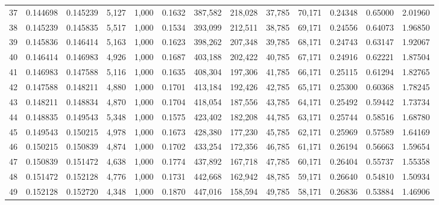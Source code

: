 \begin{tabular}{rrrrrrrrrrrrr}
37  &  0.144698 &  0.145239 &   5,127 &  1,000 &                                     0.1632 &  387,582 &  218,028 &   37,785 &   70,171 &  0.24348 &  0.65000 &  2.01960 \\
38  &  0.145239 &  0.145835 &   5,517 &  1,000 &                                     0.1534 &  393,099 &  212,511 &   38,785 &   69,171 &  0.24556 &  0.64073 &  1.96850 \\
39  &  0.145836 &  0.146414 &   5,163 &  1,000 &                                     0.1623 &  398,262 &  207,348 &   39,785 &   68,171 &  0.24743 &  0.63147 &  1.92067 \\
40  &  0.146414 &  0.146983 &   4,926 &  1,000 &                                     0.1687 &  403,188 &  202,422 &   40,785 &   67,171 &  0.24916 &  0.62221 &  1.87504 \\
41  &  0.146983 &  0.147588 &   5,116 &  1,000 &                                     0.1635 &  408,304 &  197,306 &   41,785 &   66,171 &  0.25115 &  0.61294 &  1.82765 \\
42  &  0.147588 &  0.148211 &   4,880 &  1,000 &                                     0.1701 &  413,184 &  192,426 &   42,785 &   65,171 &  0.25300 &  0.60368 &  1.78245 \\
43  &  0.148211 &  0.148834 &   4,870 &  1,000 &                                     0.1704 &  418,054 &  187,556 &   43,785 &   64,171 &  0.25492 &  0.59442 &  1.73734 \\
44  &  0.148835 &  0.149543 &   5,348 &  1,000 &                                     0.1575 &  423,402 &  182,208 &   44,785 &   63,171 &  0.25744 &  0.58516 &  1.68780 \\
45  &  0.149543 &  0.150215 &   4,978 &  1,000 &                                     0.1673 &  428,380 &  177,230 &   45,785 &   62,171 &  0.25969 &  0.57589 &  1.64169 \\
46  &  0.150215 &  0.150839 &   4,874 &  1,000 &                                     0.1702 &  433,254 &  172,356 &   46,785 &   61,171 &  0.26194 &  0.56663 &  1.59654 \\
47  &  0.150839 &  0.151472 &   4,638 &  1,000 &                                     0.1774 &  437,892 &  167,718 &   47,785 &   60,171 &  0.26404 &  0.55737 &  1.55358 \\
48  &  0.151472 &  0.152128 &   4,776 &  1,000 &                                     0.1731 &  442,668 &  162,942 &   48,785 &   59,171 &  0.26640 &  0.54810 &  1.50934 \\
49  &  0.152128 &  0.152720 &   4,348 &  1,000 &                                     0.1870 &  447,016 &  158,594 &   49,785 &   58,171 &  0.26836 &  0.53884 &  1.46906 \\

\end{tabular}
